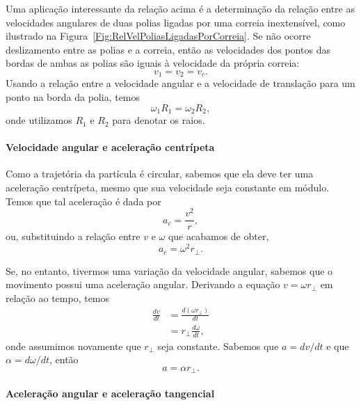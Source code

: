 Uma aplicação interessante da relação acima é a determinação da relação entre as velocidades angulares de duas polias ligadas por uma correia inextensível, como ilustrado na Figura~\ref{Fig:RelVelPoliasLigadasPorCorreia}. Se não ocorre deslizamento entre as polias e a correia, então as velocidades dos pontos das bordas de ambas as polias são iguais à velocidade da própria correia:
\begin{equation}
    v_1 = v_2 = v_c.
\end{equation}
%
Usando a relação entre a velocidade angular e a velocidade de translação para um ponto na borda da polia, temos
\begin{equation}
    \omega_1 R_1 = \omega_2 R_2,
\end{equation}
%
onde utilizamos $R_1$ e $R_2$ para denotar os raios.

\paragraph{Velocidade angular e aceleração centrípeta}

Como a trajetória da partícula é circular, sabemos que ela deve ter uma aceleração centrípeta, mesmo que sua velocidade seja constante em módulo. Temos que tal aceleração é dada por
\begin{equation}
	a_c = \frac{v^2}{r},
\end{equation}
%
ou, substituindo a relação entre $v$ e $\omega$ que acabamos de obter,
\begin{equation}
	a_c = \omega^2 r_\perp.
\end{equation}

Se, no entanto, tivermos uma variação da velocidade angular, sabemos que o movimento possui uma aceleração angular. Derivando a equação $v = \omega r_\perp$ em relação ao tempo, temos
\begin{align}
	\frac{dv}{dt} &= \frac{d(\omega r_\perp)}{dt} \\
	&=r_\perp \frac{d\omega}{dt},
\end{align}
%
onde assumimos novamente que $r_\perp$ seja constante. Sabemos que $a=dv/dt$ e que $\alpha = d\omega/dt$, então
\begin{equation}
	a = \alpha r_\perp.
\end{equation}

\paragraph{Aceleração angular e aceleração tangencial}

